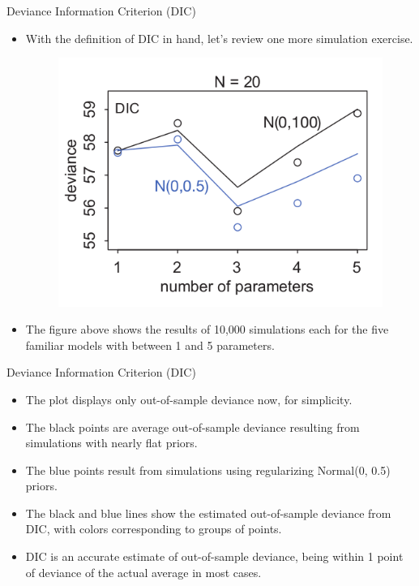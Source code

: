 \documentclass[handout]{beamer}
\begin{document}
\begin{frame}{Deviance Information Criterion (DIC)}
\scriptsize{


\begin{itemize}
\item With the definition of DIC in hand, let's review one more simulation exercise.

\begin{figure}[h!]
	\centering
	\includegraphics[scale=0.5]{pics/DIC.png}
\end{figure}

\item The figure above shows the results of 10,000 simulations each for the five familiar models with
between 1 and 5 parameters. 



\end{itemize}


} 
\end{frame}


\begin{frame}{Deviance Information Criterion (DIC)}
\scriptsize{


\begin{itemize}
 
\item The plot displays only out-of-sample deviance now, for simplicity. 
\item The black points are average out-of-sample deviance resulting from simulations with nearly flat priors.
\item The blue points result from simulations using regularizing Normal(0, 0.5)
priors. 
\item The black and blue lines show the estimated out-of-sample deviance from DIC, with colors corresponding to groups of points.

\item DIC is an accurate estimate of out-of-sample deviance, being within 1 point of deviance of the actual average in most cases.




\end{itemize}


} 
\end{frame}
\end{document}
